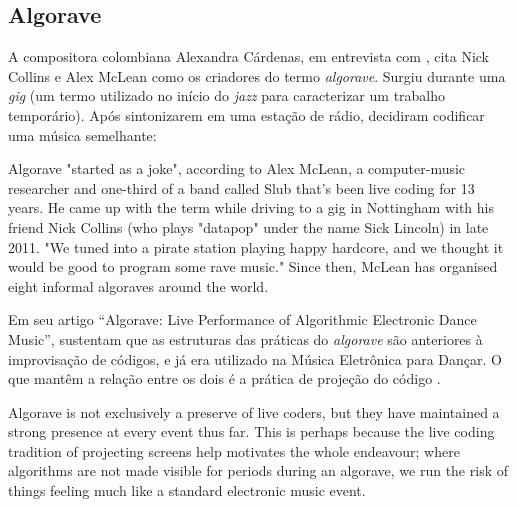 \subsection{Algorave}\label{sec:algorave}

A compositora colombiana Alexandra Cárdenas, em entrevista com , cita Nick Collins e Alex McLean como os criadores do termo \emph{algorave}. Surgiu durante uma \emph{gig} (um termo utilizado no início do \emph{jazz} para caracterizar um trabalho temporário). Após sintonizarem em uma estação de rádio, decidiram codificar uma música semelhante:

\begin{citacao}
{
Algorave "started as a joke", according to Alex McLean, a computer-music researcher and one-third of a band called Slub that's been live coding for 13 years. He came up with the term while driving to a gig in Nottingham with his friend Nick Collins (who plays "datapop" under the name Sick Lincoln) in late 2011. "We tuned into a pirate station playing happy hardcore, and we thought it would be good to program some rave music." Since then, McLean has organised eight informal algoraves around the world. 
}
\end{citacao}

Em seu artigo ``Algorave: Live Performance of Algorithmic Electronic Dance Music'',  sustentam que as estruturas das práticas do \emph{algorave} são anteriores à improvisação de códigos, e já era utilizado na Música Eletrônica para Dançar. O que mantêm a relação entre os dois é a prática de projeção do código .

\begin{citacao}
{Algorave is not exclusively a preserve of live coders, but they have maintained a strong presence at every event thus far. This is perhaps because the live coding tradition of projecting screens help motivates the whole endeavour; where algorithms are not made visible for periods during an algorave, we run the risk of things feeling much like a standard electronic music event.}

\end{citacao}

